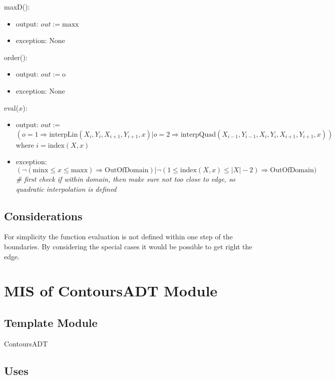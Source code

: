 \documentclass[12pt, titlepage]{article}
\begin{document}
\noindent maxD():
\begin{itemize}
\item output: $out := \mbox{maxx}$
\item exception: None
\end{itemize}

\noindent order():
\begin{itemize}
\item output: $out := \mbox{o}$
\item exception: None
\end{itemize}

\noindent eval($x$):
\begin{itemize}
\item output: $out :=$ $$(o=1 \Rightarrow \mbox{interpLin}(X_i, Y_i,
X_{i+1}, Y_{i+1}, x) | o = 2 \Rightarrow \mbox{interpQuad}(X_{i-1}, Y_{i-1}, X_i, Y_i, X_{i+1},
Y_{i+1}, x) )$$  where $i = \mbox{index}(X, x)$
\item exception: $(\neg(\mbox{minx} \leq x \leq \mbox{maxx}) \Rightarrow
  \mbox{OutOfDomain}) | \neg(1 \leq \mbox{index}(X, x) \leq |X| - 2) \Rightarrow
  \mbox{OutOfDomain})$ \textit{\# first check if within domain, then make sure
    not too close to edge, so quadratic interpolation is defined}
\end{itemize}

\subsection{Considerations}

For simplicity the function evaluation is not defined within one step of the
boundaries.  By considering the special cases it would be possible to get right
the edge.

\newpage


\section{MIS of ContoursADT Module} \label{ContoursADT}

\subsection {Template Module}

ContoursADT

\subsection {Uses}
\end{document}
